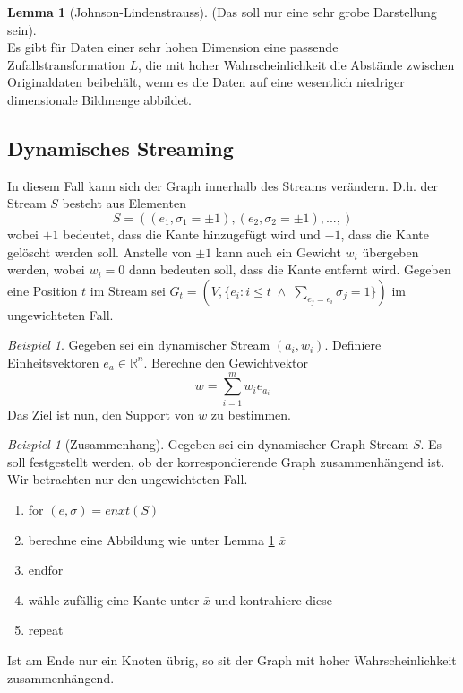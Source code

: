 \documentclass[a4paper, 12pt]{article}
\theoremstyle{plain}
\theoremstyle{definition}
\theoremstyle{lemma}
\newtheorem{lemma}[theorem]{Lemma}
\theoremstyle{remark}
\theoremstyle{corollary}
\theoremstyle{example}
\newtheorem{example}[theorem]{Beispiel}
\begin{document}
	\begin{lemma}[Johnson-Lindenstrauss]
		\label{lemma: JL}
		(Das soll nur eine sehr grobe Darstellung sein).\\
		Es gibt für Daten einer sehr hohen Dimension eine passende Zufallstransformation $L$, die mit hoher Wahrscheinlichkeit die Abstände zwischen Originaldaten beibehält, wenn es die Daten auf eine wesentlich niedriger dimensionale Bildmenge abbildet.
	\end{lemma}
	\subsection{Dynamisches Streaming}
	In diesem Fall kann sich der Graph innerhalb des Streams verändern. D.h. der Stream $S$ besteht aus Elementen \[S = ((e_1,\sigma_1 = \pm 1), (e_2,\sigma_2 =\pm 1), ..., )\]
	wobei $+1$ bedeutet, dass die Kante hinzugefügt wird und $-1$, dass die Kante gelöscht werden soll. Anstelle von $\pm1$ kann auch ein Gewicht $w_i$ übergeben werden, wobei $w_i = 0$ dann bedeuten soll, dass die Kante entfernt wird. Gegeben eine Position $t$ im Stream sei $G_t = (V, \{e_i: i\leq t \; \land \; \sum_{e_j=e_i} \sigma_j = 1\})$ im ungewichteten Fall.\\
	\begin{example}
		Gegeben sei ein dynamischer Stream $(a_i,w_i)$. Definiere Einheitsvektoren $e_a \in \mathbb{R}^n$. Berechne den Gewichtvektor \[w = \sum_{i=1}^{m} w_ie_{a_i}\]
		Das Ziel ist nun, den Support von $w$ zu bestimmen.
	\end{example}
	\begin{example}[Zusammenhang]
		Gegeben sei ein dynamischer Graph-Stream $S$. Es soll festgestellt werden, ob der korrespondierende Graph zusammenhängend ist. Wir betrachten nur den ungewichteten Fall. \begin{enumerate}
			\item for $(e,\sigma) = enxt(S)$
			\item berechne eine Abbildung wie unter Lemma \ref{lemma: JL} $\bar x$
			\item endfor
			\item wähle zufällig eine Kante unter $\bar x$ und kontrahiere diese
			\item repeat
		\end{enumerate}
	Ist am Ende nur ein Knoten übrig, so sit der Graph mit hoher Wahrscheinlichkeit zusammenhängend.
	\end{example}
\end{document}

